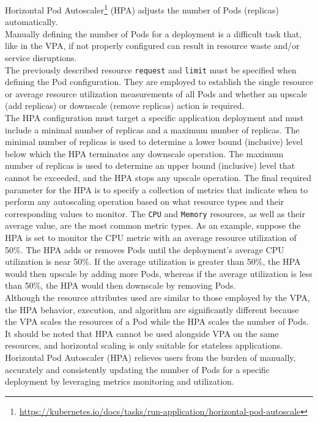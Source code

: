 Horizontal Pod Autoscaler\footnote{\url{https://kubernetes.io/docs/tasks/run-application/horizontal-pod-autoscale}}
(HPA) adjusts the number of Pods (replicas) automatically. \\ %

Manually defining the number of Pods for a deployment is a difficult task that,
like in the VPA, if not properly configured can result in resource waste and/or service
disruptions. \\ %
The previously described resource \texttt{request} and \texttt{limit} must be specified
when defining the Pod configuration. They are employed to establish the single
resource or average resource utilization measurements of all Pods and whether an
upscale (add replicas) or downscale (remove replicas) action is required. \\ %
The HPA configuration must target a specific application deployment and must
include a minimal number of replicas and a maximum number of replicas. The minimal
number of replicas is used to determine a lower bound (inclusive) level below which
the HPA terminates any downscale operation. The maximum number of replicas is
used to determine an upper bound (inclusive) level that cannot be exceeded, and the
HPA stops any upscale operation. The final required parameter for the HPA is to
specify a collection of metrics that indicate when to perform any autoscaling
operation based on what resource types and their corresponding values to monitor.
The \texttt{CPU} and \texttt{Memory} resources, as well as their average value, are
the most common metric types. As an example, suppose the HPA is set to monitor the
CPU metric with an average resource utilization of 50\%. The HPA adds or removes
Pods until the deployment's average CPU utilization is near 50\%. If the average
utilization is greater than 50\%, the HPA would then upscale by adding more Pods,
whereas if the average utilization is less than 50\%, the HPA would then
downscale by removing Pods. \\ %
Although the resource attributes used are similar to those employed by the VPA, the
HPA behavior, execution, and algorithm are significantly different because the VPA
scales the resources of a Pod while the HPA scales the number of Pods. It should
be noted that HPA cannot be used alongside VPA on the same resources, and horizontal
scaling is only suitable for stateless applications. \\ %
Horizontal Pod Autoscaler (HPA) relieves users from the burden of manually,
accurately and consistently updating the number of Pods for a specific
deployment by leveraging metrics monitoring and utilization.

